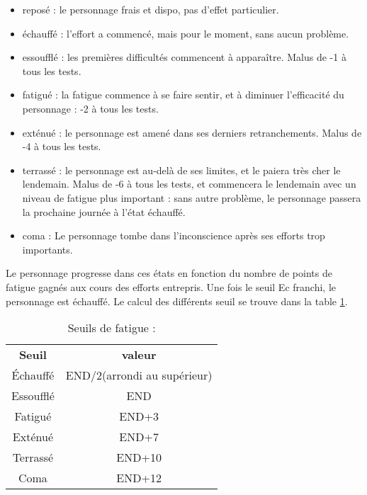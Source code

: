 \documentclass[10pt,a4paper,twocolumn]{book}
\begin{document}
\begin{itemize}

\item{reposé} : le personnage frais et dispo, pas d’effet particulier.
\item{échauffé} : l’effort a commencé, mais pour le moment, sans aucun problème.
\item{essoufflé} : les premières difficultés commencent à apparaître. Malus de -1 à tous les tests.
\item{fatigué} : la fatigue commence à se faire sentir, et à diminuer l’efficacité du personnage : -2 à tous les tests.
\item{exténué} : le personnage est amené dans ses derniers retranchements. Malus de -4 à tous les tests.
\item{terrassé} : le personnage est au-delà de ses limites, et le paiera très cher le lendemain. Malus de -6 à tous les tests, et commencera le lendemain avec un niveau de fatigue plus important : sans autre problème, le personnage passera la prochaine journée à l’état échauffé.
\item{coma} : Le personnage tombe dans l’inconscience après ses efforts trop importants.
\end{itemize}
Le personnage progresse dans ces états en fonction du nombre de points de fatigue gagnés aux cours des efforts entrepris.
Une fois le seuil Ec franchi, le personnage est échauffé. 
Le calcul des différents seuil se trouve dans la table \ref{tableSeuilsFatigue}.

\begin{table}
\caption{ Seuils de fatigue :}
\label{tableSeuilsFatigue}
\begin{center}
\begin{tabular}{cc}
\textbf{Seuil} & \textbf{valeur} \\
   Échauffé & END/2(arrondi au supérieur)  \\
   Essoufflé & END  \\
   Fatigué & END+3 \\
   Exténué & END+7 \\
   Terrassé & END+10 \\
   Coma & END+12 \\
\end{tabular}
\end{center}
\end{table}
\end{document}
